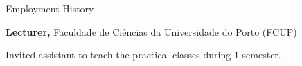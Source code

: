 

\begin{rubric}{Employment History}

%
%
	\textbf{Lecturer,} Faculdade de Ciências da Universidade do Porto (FCUP)
	\par Invited assistant to teach the practical classes during 1 semester.
%



\end{rubric}






